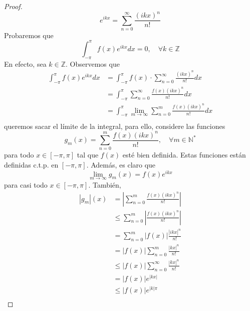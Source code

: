 \documentclass[12pt]{report}
\theoremstyle{largebreak}
\newcommand\abs[1]{\ensuremath{\left|#1\right|}}
\begin{document}
\begin{proof}
        \begin{equation*}
            e^{ ikx}=\sum_{ n=0}^\infty\frac{(ikx)^n}{n!}
        \end{equation*}
        Probaremos que
        \begin{equation*}
            \int_{-\pi}^\pi f(x)e^{ ikx}dx=0,\quad\forall k\in\mathbb{Z}
        \end{equation*}
        En efecto, sea $k\in\mathbb{Z}$. Observemos que
        \begin{equation*}
            \begin{split}
                \int_{-\pi}^\pi f(x)e^{ ikx}dx&=\int_{-\pi}^\pi f(x)\cdot\sum_{ n=0}^\infty\frac{(ikx)^n}{n!} dx\\
                &=\int_{-\pi}^\pi\sum_{ n=0}^\infty\frac{f(x)(ikx)^n}{n!} dx\\
                &=\int_{-\pi}^\pi\lim_{ m\rightarrow\infty} \sum_{ n=0}^m\frac{f(x)(ikx)^n}{n!} dx\\
            \end{split}
        \end{equation*}
        queremos sacar el límite de la integral, para ello, considere las funciones
        \begin{equation*}
            g_m(x)=\sum_{ n=0}^m\frac{f(x)(ikx)^n}{n!},\quad\forall m\in\mathbb{N}^*
        \end{equation*}
        para todo $x\in[-\pi,\pi]$ tal que $f(x)$ esté bien definida. Estas funciones están definidas c.t.p. en $[-\pi,\pi]$. Además, es claro que
        \begin{equation*}
            \lim_{ m\rightarrow\infty}g_m(x)=f(x)e^{ ikx}
        \end{equation*}
        para casi todo $x\in[-\pi,\pi]$. También,
        \begin{equation*}
            \begin{split}
                \abs{g_m}(x)&=\abs{\sum_{ n=0}^m\frac{f(x)(ikx)^n}{n!}}\\
                &\leq\sum_{ n=0}^m\abs{\frac{f(x)(ikx)^n}{n!}}\\
                &=\sum_{ n=0}^m\abs{f(x)}\frac{\abs{ikx}^n}{n!}\\
                &=\abs{f(x)}\sum_{ n=0}^m\frac{\abs{kx}^n}{n!}\\
                &\leq\abs{f(x)}\sum_{ n=0}^\infty\frac{\abs{kx}^n}{n!}\\
                &=\abs{f(x)}e^{\abs{kx}}\\
                &\leq\abs{f(x)}e^{\abs{k}\pi}\\

\end{split}
\end{equation*}
\end{proof}
\end{document}
